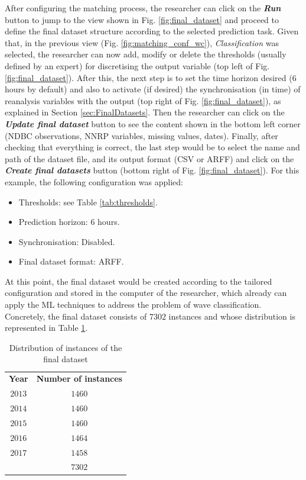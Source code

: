 \documentclass[energies,article,submit,moreauthors,pdftex]{Definitions/mdpi}
\begin{document}
			After configuring the matching process, the researcher can click on the \textbf{\textit{Run}} button to jump to the view shown in Fig. \ref{fig:final_dataset} and proceed to define the final dataset structure according to the selected prediction task. Given that, in the previous view (Fig. \ref{fig:matching_conf_wc}), \textit{Classification} was selected, the researcher can now add, modify or delete the thresholds (usually defined by an expert) for discretising the output variable (top left of Fig. \ref{fig:final_dataset}). After this, the next step is to set the time horizon desired (6 hours by default) and also to activate (if desired) the synchronisation (in time) of reanalysis variables with the output (top right of Fig. \ref{fig:final_dataset}), as explained in Section {\ref{sec:FinalDatasets}}. Then the researcher can click on the \textbf{\textit{Update final dataset}} button to see the content shown in the bottom left corner (NDBC observations, NNRP variables, missing values, dates). Finally, after checking that everything is correct, the last step would be to select the name and path of the dataset file, and its output format (CSV or ARFF) and click on the \textbf{\textit{Create final datasets}} button (bottom right of Fig. \ref{fig:final_dataset}). For this example, the following configuration was applied:
			\begin{itemize}
				\item Thresholds: see Table \ref{tab:thresholds}.
				\item Prediction horizon: 6 hours.
				\item Synchronisation: Disabled.
				\item Final dataset format: ARFF.
			\end{itemize}
			
			At this point, the final dataset would be created according to the tailored configuration and stored in the computer of the researcher, which already can apply the ML techniques to address the problem of wave classification. Concretely, the final dataset consists of $7302$ instances and whose distribution is represented in Table \ref{tab:datasetDistribution}.
				\begin{table}[!h]%
					\caption{Distribution of instances of the final dataset}
					\label{tab:datasetDistribution}
					\centering
					\begin{tabular}{cc}
						\cline{1-2}
						\textbf{Year}&\textbf{Number of instances}\\
						\cline{1-2}
						$2013$&$1460$\\
						$2014$&$1460$\\
						$2015$&$1460$\\
						$2016$&$1464$\\
						$2017$&$1458$\\
						\cline{1-2}
						&$7302$\\
						\cline{1-2}
					\end{tabular}
				\end{table}
\end{document}
